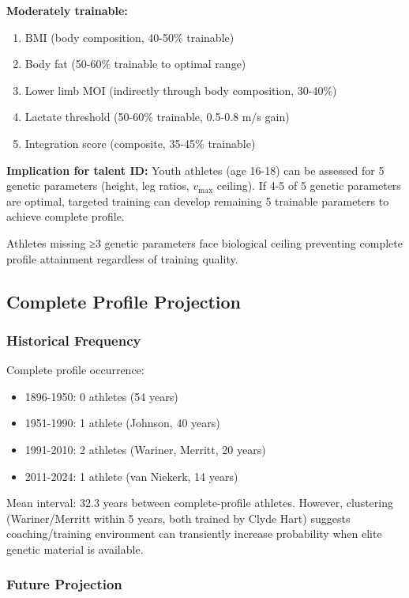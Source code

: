 \textbf{Moderately trainable:}
\begin{enumerate}
    \item BMI (body composition, 40-50\% trainable)
    \item Body fat (50-60\% trainable to optimal range)
    \item Lower limb MOI (indirectly through body composition, 30-40\%)
    \item Lactate threshold (50-60\% trainable, 0.5-0.8 m/s gain)
    \item Integration score (composite, 35-45\% trainable)
\end{enumerate}

\textbf{Implication for talent ID:} Youth athletes (age 16-18) can be assessed for 5 genetic parameters (height, leg ratios, $v_{\max}$ ceiling). If 4-5 of 5 genetic parameters are optimal, targeted training can develop remaining 5 trainable parameters to achieve complete profile.

Athletes missing ≥3 genetic parameters face biological ceiling preventing complete profile attainment regardless of training quality.

\subsection{Complete Profile Projection}

\subsubsection{Historical Frequency}

Complete profile occurrence:
\begin{itemize}
    \item 1896-1950: 0 athletes (54 years)
    \item 1951-1990: 1 athlete (Johnson, 40 years)
    \item 1991-2010: 2 athletes (Wariner, Merritt, 20 years)
    \item 2011-2024: 1 athlete (van Niekerk, 14 years)
\end{itemize}

Mean interval: 32.3 years between complete-profile athletes. However, clustering (Wariner/Merritt within 5 years, both trained by Clyde Hart) suggests coaching/training environment can transiently increase probability when elite genetic material is available.

\subsubsection{Future Projection}

